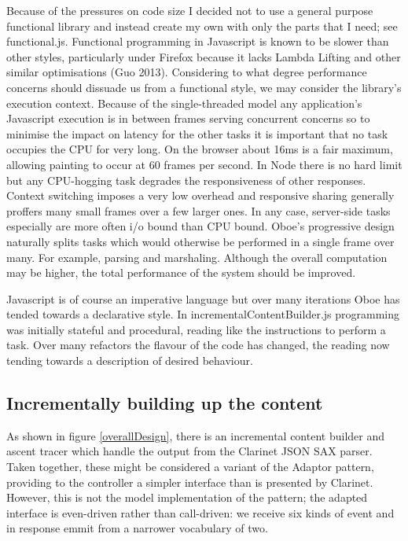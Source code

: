 \documentclass[]{article}
\begin{document}
Because of the pressures on code size I decided not to use a general
purpose functional library and instead create my own with only the parts
that I need; see functional.js. Functional programming in Javascript is
known to be slower than other styles, particularly under Firefox because
it lacks Lambda Lifting and other similar optimisations (Guo 2013).
Considering to what degree performance concerns should dissuade us from
a functional style, we may consider the library's execution context.
Because of the single-threaded model any application's Javascript
execution is in between frames serving concurrent concerns so to
minimise the impact on latency for the other tasks it is important that
no task occupies the CPU for very long. On the browser about 16ms is a
fair maximum, allowing painting to occur at 60 frames per second. In
Node there is no hard limit but any CPU-hogging task degrades the
responsiveness of other responses. Context switching imposes a very low
overhead and responsive sharing generally proffers many small frames
over a few larger ones. In any case, server-side tasks especially are
more often i/o bound than CPU bound. Oboe's progressive design naturally
splits tasks which would otherwise be performed in a single frame over
many. For example, parsing and marshaling. Although the overall
computation may be higher, the total performance of the system should be
improved.

Javascript is of course an imperative language but over many iterations
Oboe has tended towards a declarative style. In
incrementalContentBuilder.js programming was initially stateful and
procedural, reading like the instructions to perform a task. Over many
refactors the flavour of the code has changed, the reading now tending
towards a description of desired behaviour.

\subsection{Incrementally building up the content}

As shown in figure \ref{overallDesign}, there is an incremental content
builder and ascent tracer which handle the output from the Clarinet JSON
SAX parser. Taken together, these might be considered a variant of the
Adaptor pattern, providing to the controller a simpler interface than is
presented by Clarinet. However, this is not the model implementation of
the pattern; the adapted interface is even-driven rather than
call-driven: we receive six kinds of event and in response emmit from a
narrower vocabulary of two.
\end{document}
